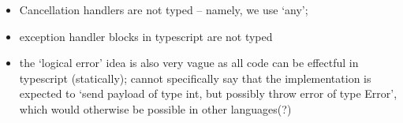 \begin{itemize}
\item Cancellation handlers are not typed -- namely, we use `any';
\item exception handler blocks in typescript are not typed
\item the `logical error' idea is also very vague as all code can be effectful in typescript (statically); cannot specifically say that the implementation is expected to `send payload of type int, but possibly throw error of type Error', which would otherwise be possible in other languages(?)
\end{itemize}
